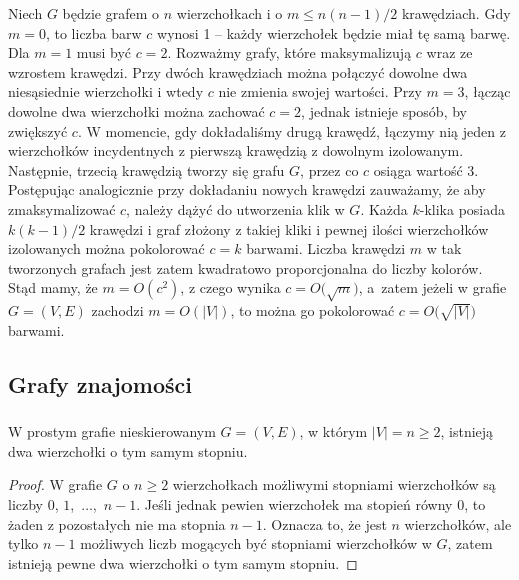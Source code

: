 Niech $G$ będzie grafem o $n$ wierzchołkach i o $m\le n(n-1)/2$ krawędziach. Gdy $m=0$, to liczba barw $c$ wynosi 1 -- każdy wierzchołek będzie miał tę samą barwę. Dla $m=1$ musi być $c=2$. Rozważmy grafy, które maksymalizują $c$ wraz ze wzrostem krawędzi. Przy dwóch krawędziach można połączyć dowolne dwa niesąsiednie wierzchołki i wtedy $c$ nie zmienia swojej wartości. Przy $m=3$, łącząc dowolne dwa wierzchołki można zachować $c=2$, jednak istnieje sposób, by zwiększyć $c$. W momencie, gdy dokładaliśmy drugą krawędź, łączymy nią jeden z wierzchołków incydentnych z pierwszą krawędzią z dowolnym izolowanym. Następnie, trzecią krawędzią tworzy się  grafu $G$, przez co $c$ osiąga wartość 3. Postępując analogicznie przy dokładaniu nowych krawędzi zauważamy, że aby zmaksymalizować $c$, należy dążyć do utworzenia klik w $G$. Każda $k$-klika posiada $k(k-1)/2$ krawędzi i graf złożony z takiej kliki i pewnej ilości wierzchołków izolowanych można pokolorować $c=k$ barwami. Liczba krawędzi $m$ w tak tworzonych grafach jest zatem kwadratowo proporcjonalna do liczby kolorów. Stąd mamy, że $m=O(c^2)$, z czego wynika $c=O\bigl(\!\sqrt{m}\bigr)$, a~zatem jeżeli w grafie $G=(V,E)$ zachodzi $m=O(|V|)$, to można go pokolorować $c=O\bigl(\!\sqrt{|V|}\bigr)$ barwami.

\subsection{Grafy znajomości} %
\subsubsection{} %
\begin{twierdzenie*}
	W prostym grafie nieskierowanym $G=(V,E)$, w którym $|V|=n\ge2$, istnieją dwa wierzchołki o tym samym stopniu.
\end{twierdzenie*}
\begin{proof}
W grafie $G$ o $n\ge2$ wierzchołkach możliwymi stopniami wierzchołków są liczby $0$, $1$,~$\dots$,~$n-1$. Jeśli jednak pewien wierzchołek ma stopień równy 0, to żaden z pozostałych nie ma stopnia $n-1$. Oznacza to, że jest $n$ wierzchołków, ale tylko $n-1$ możliwych liczb mogących być stopniami wierzchołków w $G$, zatem istnieją pewne dwa wierzchołki o tym samym stopniu.
\end{proof}

